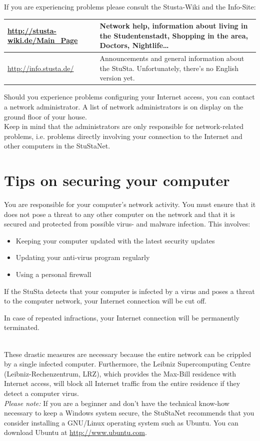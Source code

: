 \documentclass[a4paper,12pt]{scrartcl}
\begin{document}
If you are experiencing problems please consult the Stusta-Wiki and the Info-Site:

\begin{center}
  \begin{tabularx}{\linewidth}{|lX|}
    \hline
    \url{http://stusta-wiki.de/Main_Page} & Network help, information about living in the Studentenstadt, Shopping in the area, Doctors, Nightlife\dots\\
    \hline
    \url{http://info.stusta.de/} & Announcements and general information about the StuSta. Unfortunately, there's no English version yet.\\
    \hline
  \end{tabularx}
\end{center}
Should you experience problems configuring your Internet access, you can contact a network administrator. A list of network administrators is on display on the ground floor of your house.
\\
Keep in mind that the administrators are only responsible for network-related problems, i.e. problems directly involving your connection to the Internet and other computers in the StuStaNet.
\newpage
\section*{Tips on securing your computer}
You are responsible for your computer's network activity. You must ensure that it does not pose a threat to any other computer on the network and that it is secured and protected from possible virus- and malware infection. This involves:
\begin{itemize}
	\item Keeping your computer updated with the latest security updates
	\item Updating your anti-virus program regularly
	\item Using a personal firewall
\end{itemize}
If the StuSta detects that your computer is infected by a virus and poses a threat to the computer network, your Internet connection will be cut off.
\\
\begin{em}
	In case of repeated infractions, your Internet connection will be permanently terminated.
\end{em}
\\
These drastic measures are necessary because the entire network can be crippled by a single infected computer. Furthermore, the Leibniz Supercomputing Centre (Leibniz-Rechenzentrum, LRZ), which provides the Max-Bill residence with Internet access, will block all Internet traffic from the entire residence if they detect a computer virus.
\\
\emph{Please note:} If you are a beginner and don't have the technical know-how necessary to keep a Windows system secure, the StuStaNet recommends that you consider installing a GNU/Linux operating system such as Ubuntu. You can download Ubuntu at \url{http://www.ubuntu.com}.
\end{document}
